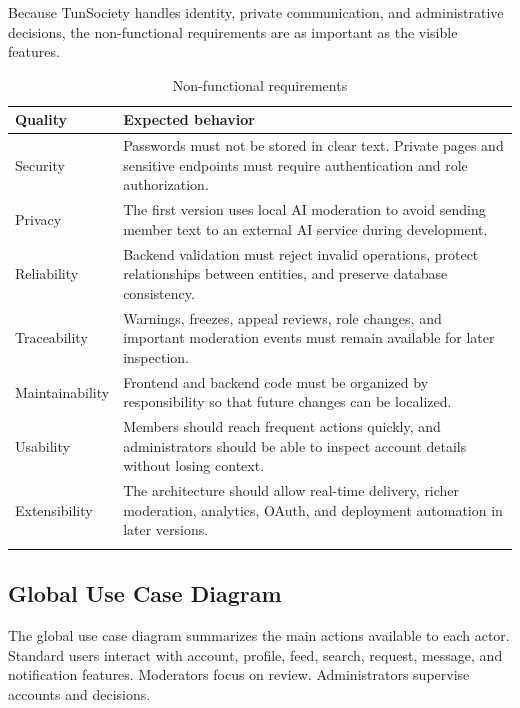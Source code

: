 Because TunSociety handles identity, private communication, and administrative decisions, the non-functional requirements are as important as the visible features.

\begin{longtable}{|m{3.2cm}|m{10.5cm}|}
\hline
\textbf{Quality} & \textbf{Expected behavior} \\
\hline
Security & Passwords must not be stored in clear text. Private pages and sensitive endpoints must require authentication and role authorization. \\
\hline
Privacy & The first version uses local AI moderation to avoid sending member text to an external AI service during development. \\
\hline
Reliability & Backend validation must reject invalid operations, protect relationships between entities, and preserve database consistency. \\
\hline
Traceability & Warnings, freezes, appeal reviews, role changes, and important moderation events must remain available for later inspection. \\
\hline
Maintainability & Frontend and backend code must be organized by responsibility so that future changes can be localized. \\
\hline
Usability & Members should reach frequent actions quickly, and administrators should be able to inspect account details without losing context. \\
\hline
Extensibility & The architecture should allow real-time delivery, richer moderation, analytics, OAuth, and deployment automation in later versions. \\
\hline
\caption{Non-functional requirements}
\end{longtable}

\subsection{Global Use Case Diagram}

The global use case diagram summarizes the main actions available to each actor. Standard users interact with account, profile, feed, search, request, message, and notification features. Moderators focus on review. Administrators supervise accounts and decisions.

